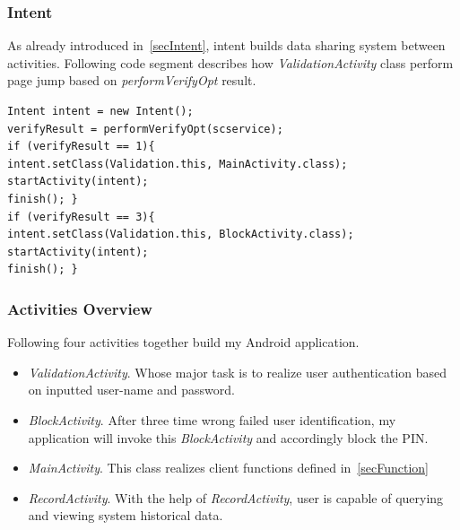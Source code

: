 \subsubsection{Intent}
As already introduced in~\ref{secIntent}, intent builds data sharing system between activities. Following code segment describes how \emph{ValidationActivity} class perform page jump based on \emph{performVerifyOpt} result.
\begin{Verbatim}[fontsize=\relsize{-1},frame=lines,framesep=4mm, label=\fbox{\small\emph{Intent}}]
Intent intent = new Intent();           			  	
verifyResult = performVerifyOpt(scservice);
if (verifyResult == 1){
intent.setClass(Validation.this, MainActivity.class);  
startActivity(intent);  
finish(); }
if (verifyResult == 3){
intent.setClass(Validation.this, BlockActivity.class);  
startActivity(intent);  
finish(); }
\end{Verbatim}
\subsubsection{Activities Overview}
Following four activities together build my Android application.
\begin{itemize}
\item \emph{ValidationActivity}. Whose major task is to realize user authentication based on inputted user-name and password.
\item \emph{BlockActivity}. After three time wrong failed user identification, my application will invoke this \emph{BlockActivity} and accordingly block the PIN.
\item \emph{MainActivity}. This class realizes client functions defined in~\ref{secFunction}
\item \emph{RecordActivity}. With the help of \emph{RecordActivity}, user is capable of querying and viewing system historical data.
\end{itemize}

